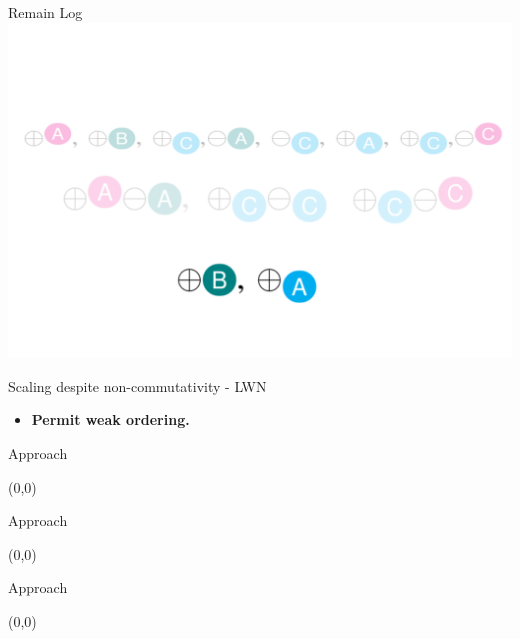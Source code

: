 \documentclass[english]{beamer} %
\begin{document}
\begin{frame}{Remain Log}
\includegraphics[scale=0.5]{fig/example_3}
\end{frame}


\begin{frame}{Scaling despite non-commutativity - LWN}
    \begin{itemize}[<+-| alert@+>]
    \item \textbf{Permit weak ordering.}
    \end{itemize}
\end{frame}

\begin{frame}{Approach}
\begin{textblock}{1}(0,0)
\end{textblock}
\end{frame}

\begin{frame}{Approach}
\begin{textblock}{1}(0,0)
\end{textblock}
\end{frame}


\begin{frame}{Approach}
\begin{textblock}{1}(0,0)
\end{textblock}
\end{frame}



\end{document}
